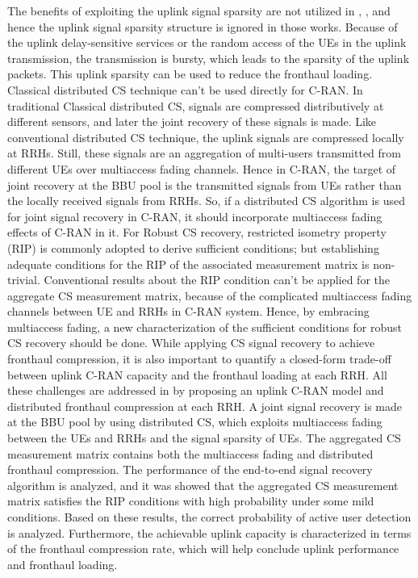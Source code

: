 \begin{multicols}{2}
\begin{itemize}
The benefits of exploiting the uplink signal sparsity are not utilized in \cite{art3-key52}, \cite{art3-key53}, and hence the uplink signal sparsity structure is ignored in those works. Because of the uplink delay-sensitive services or the random access of the UEs in the uplink transmission, the transmission is bursty, which leads to the sparsity of the uplink packets. This uplink sparsity can be used to reduce the fronthaul loading. Classical distributed CS technique can’t be used directly for C-RAN. In traditional Classical distributed CS, signals are compressed distributively at different sensors, and later the joint recovery of these signals is made. Like conventional distributed CS technique, the uplink signals are compressed locally at RRHs. Still, these signals are an aggregation of multi-users transmitted from different UEs over multiaccess fading channels. Hence in C-RAN, the target of joint recovery at the BBU pool is the transmitted signals from UEs rather than the locally received signals from RRHs. So, if a distributed CS algorithm is used for joint signal recovery in C-RAN, it should incorporate multiaccess fading effects of C-RAN in it. For Robust CS recovery, restricted isometry property (RIP) is commonly adopted to derive sufficient conditions; but establishing adequate conditions for the RIP of the associated measurement matrix is non-trivial. Conventional results about the RIP condition can’t be applied for the aggregate CS measurement matrix, because of the complicated multiaccess fading channels between UE and RRHs in C-RAN system. Hence, by embracing multiaccess fading, a new characterization of the sufficient conditions for robust CS recovery should be done. While applying CS signal recovery to achieve fronthaul compression, it is also important to quantify a closed-form trade-off between uplink C-RAN capacity and the fronthaul loading at each RRH. All these challenges are addressed in \cite{art3-key54} by proposing an uplink C-RAN model and distributed fronthaul compression at each RRH. A joint signal recovery is made at the BBU pool by using distributed CS, which exploits multiaccess fading between the UEs and RRHs and the signal sparsity of UEs. The aggregated CS measurement matrix contains both the multiaccess fading and distributed fronthaul compression. The performance of the end-to-end signal recovery algorithm is analyzed, and it was showed that the aggregated CS measurement matrix satisfies the RIP conditions with high probability under some mild conditions. Based on these results, the correct probability of active user detection is analyzed. Furthermore, the achievable uplink capacity is characterized in terms of the fronthaul compression rate, which will help conclude uplink performance and fronthaul loading. 


\end{itemize}
\end{multicols}
